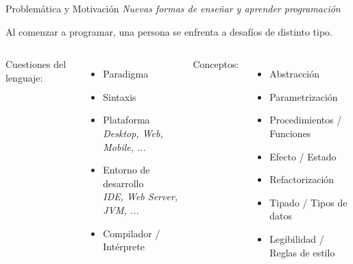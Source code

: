 \documentclass{beamer}
\begin{document}
\begin{frame}[plain]
    \titlepage
\end{frame}


\begin{frame}
    {Problemática y Motivación}
    {\emph{Nuevas formas de enseñar y aprender programación}}

    Al comenzar a programar, una persona se enfrenta a
    desafíos de distinto tipo.

    \vspace{1.5em}

    \begin{columns}[t]
            Cuestiones del lenguaje:
            \vspace{.5em}
            \begin{itemize}
                \item Paradigma
                \item Sintaxis
                \item Plataforma \\
                      {\footnotesize\emph{Desktop, Web, Mobile, ...}}
                \item Entorno de desarrollo \\
                      {\footnotesize\emph{IDE, Web Server, JVM, ...}}
                \item Compilador / Intérprete
            \end{itemize}

            Conceptos:
            \vspace{.5em}
            \begin{itemize}
                \item Abstracción
                \item Parametrización
                \item Procedimientos / Funciones
                \item Efecto / Estado
                \item Refactorización
                \item Tipado / Tipos de datos
                \item Legibilidad / Reglas de estilo
            \end{itemize}

    \end{columns}

\end{frame}
\end{document}
